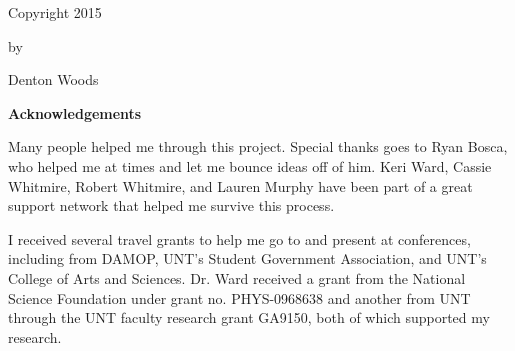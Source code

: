 \documentclass[12pt,openany]{book}
\def\biblio{}
\begin{document}
\def\biblio{}



{} %




\newpage
\vspace*{\fill}
\begingroup
\centering
Copyright 2015

by

Denton Woods

\endgroup
\vspace*{\fill}
\newpage



\clearpage
{}
\thispagestyle{plain}
\begin{center}
    \large
    \textbf{Acknowledgements}
\end{center}

Many people helped me through this project. Special thanks goes to Ryan 
Bosca, who helped me at times and let me bounce ideas off of him. Keri Ward,
Cassie Whitmire, Robert Whitmire, 
and Lauren Murphy have been part of a great support network that helped me
survive this process.

I received several travel grants to help me go to and present at conferences, 
including from DAMOP, UNT's Student Government Association, and UNT's College 
of Arts and Sciences. Dr. Ward received a grant from the National Science 
Foundation under grant no. PHYS-0968638 and another from UNT through the UNT 
faculty research grant GA9150, both of which supported my research.
\end{document}
